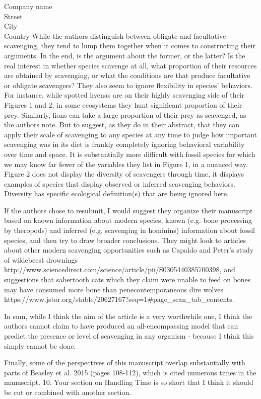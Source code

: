 \documentclass{letter}
\begin{document}
\begin{letter}{Company name \\ Street\\ City\\ Country}
While the authors distinguish between obligate and facultative scavenging, they tend to lump them together when it comes to constructing their arguments. In the end, is the argument about the former, or the latter? Is the real interest in whether species scavenge at all, what proportion of their resources are obtained by scavenging, or what the conditions are that produce facultative or obligate scavengers? They also seem to ignore flexibility in species' behaviors. For instance, while spotted hyenas are on their highly scavenging side of their Figures 1 and 2, in some ecosystems they hunt significant proportion of their prey. Similarly, lions can take a large proportion of their prey as scavenged, as the authors note. But to suggest, as they do in their abstract, that they can apply their scale of scavenging to any species at any time to judge how important scavenging was in its diet is frankly completely ignoring behavioral variability over time and space. It is substantially more difficult with fossil species for which we may know far fewer of the variables they list in Figure 1, in a nuanced way. Figure 2 does not display the diversity of scavengers through time, it displays examples of species that display observed or inferred scavenging behaviors. Diversity has specific ecological definition(s) that are being ignored here.

If the authors chose to resubmit, I would suggest they organize their manuscript based on known information about modern species, known (e.g. bone processing by theropods) and inferred (e.g. scavenging in hominins) information about fossil species, and then try to draw broader conclusions. They might look to articles about other modern scavenging opportunities such as Capaldo and Peter's study of wildebeest drownings http://www.sciencedirect.com/science/article/pii/S0305440385700398, and suggestions that sabertooth cats which they claim were unable to feed on bones may have consumed more bone than penecontemporaneous dire wolves https://www.jstor.org/stable/20627167?seq=1#page_scan_tab_contents.

In sum, while I think the aim of the article is a very worthwhile one, I think the authors cannot claim to have produced an all-encompassing model that can predict the presence or level of scavenging in any organism - because I think this simply cannot be done.

Finally, some of the perspectives of this manuscript overlap substantially with parts of Beasley et al. 2015 (pages 108-112), which is cited numerous times in the manuscript.
10.     Your section on Handling Time is so short that I think it should be cut or combined with another section.



\end{letter}
\end{document}
